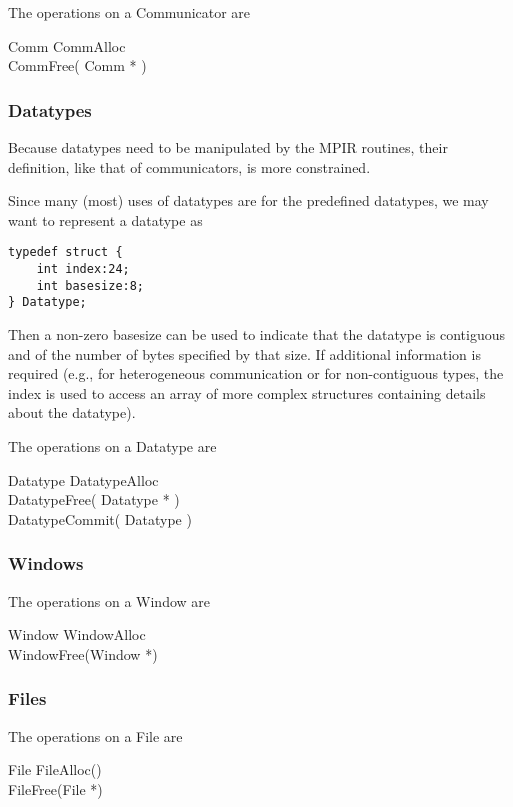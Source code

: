 \documentclass{article}
\begin{document}
The operations on a Communicator are
\begin{description}
\item[Comm CommAlloc]
\item[CommFree( Comm * )]
\end{description}

\subsubsection{Datatypes}
Because datatypes need to be manipulated by the MPIR routines, their
definition, like that of communicators, is more constrained.

Since many (most) uses of datatypes are for the predefined datatypes, we may
want to represent a datatype as 
\begin{verbatim}
typedef struct {
    int index:24;
    int basesize:8;
} Datatype;
\end{verbatim}
Then a non-zero basesize can be used to indicate that the datatype is
contiguous and of the number of bytes specified by that size.  If additional
information is required (e.g., for heterogeneous communication or for
non-contiguous types, the index is used to access an array of more complex
structures containing details about the datatype).

The operations on a Datatype are
\begin{description}
\item[Datatype DatatypeAlloc]
\item[DatatypeFree( Datatype * )]
\item[DatatypeCommit( Datatype )]
\end{description}

\subsubsection{Windows}

The operations on a Window are
\begin{description}
\item[Window WindowAlloc]
\item[WindowFree(Window *)]
\end{description}


\subsubsection{Files}

The operations on a File are
\begin{description}
\item[File FileAlloc()]
\item[FileFree(File *)]
\end{description}
\end{document}
